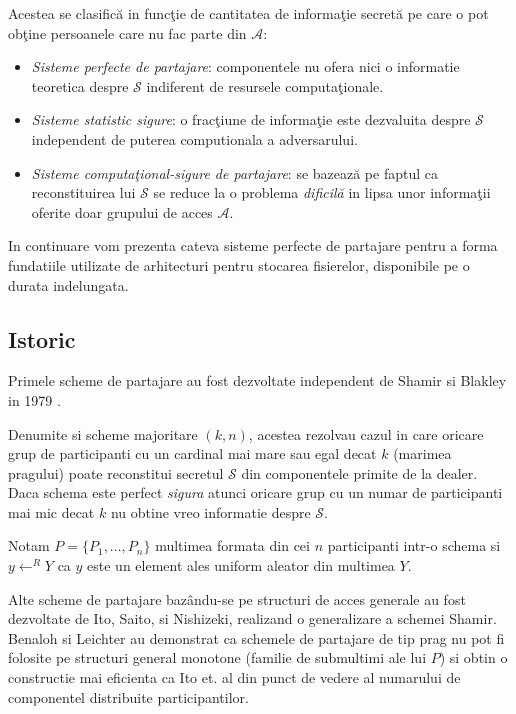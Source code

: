 \documentclass{llncs}
\newcommand{\todo}[1]{{\color{red}{TODO #1}}}
\begin{document}
Acestea se clasific\u{a} in func\c{t}ie de cantitatea de informa\c{t}ie secret\u{a} pe care o pot ob\c{t}ine persoanele care nu fac parte din $\mathcal{A}$:
\begin{itemize}
	\item \textit{Sisteme perfecte de partajare}: componentele nu ofera nici o informatie teoretica despre $\mathcal{S}$ indiferent de resursele computa\c{t}ionale.
	\item \textit{Sisteme statistic sigure}: o frac\c{t}iune de informa\c{t}ie este dezvaluita despre $\mathcal{S}$ independent de puterea computionala a adversarului.
	\item \textit{Sisteme computa\c{t}ional-sigure de partajare}: se bazeaz\u{a} pe faptul ca reconstituirea lui $\mathcal{S}$ se reduce la o problema \textit{dificil\u{a}}\cite{boneh:1998decision} in lipsa unor informa\c{t}ii oferite doar grupului de acces $\mathcal{A}$.
\end{itemize} 

In continuare vom prezenta cateva sisteme perfecte de partajare pentru a forma fundatiile utilizate de arhitecturi pentru stocarea fisierelor, disponibile pe o durata indelungata.

\subsection{Istoric}

Primele scheme de partajare au fost dezvoltate independent de Shamir si Blakley in 1979 \cite{B:1979, S:1979}.

Denumite si scheme majoritare $(k, n)$, acestea rezolvau cazul in care oricare grup de participanti cu un cardinal mai mare sau egal decat $k$  (marimea pragului) poate reconstitui secretul $\mathcal{S}$ din componentele primite de la dealer. Daca schema este perfect \textit{sigura} atunci oricare grup cu un numar de participanti mai mic decat $k$ nu obtine vreo informatie despre $\mathcal{S}$.

Notam $P = \{P_1, \dots, P_n\}$ multimea formata din cei $n$ participanti intr-o schema si $y \leftarrow^R Y$ ca $y$ este un element ales uniform aleator din multimea $Y$.

Alte scheme de partajare baz\^{a}ndu-se pe structuri de acces generale au fost dezvoltate de Ito, Saito, si Nishizeki, realizand o generalizare a schemei Shamir. \cite{ITO:1989}
Benaloh si Leichter au demonstrat ca schemele de partajare de tip prag nu pot fi folosite pe structuri general monotone (familie de submultimi ale lui $P$) si obtin o constructie mai eficienta ca Ito et. al \cite{ITO:1989} din punct de vedere al numarului de componentel distribuite participantilor. \cite{JJ:1990}
\end{document}
